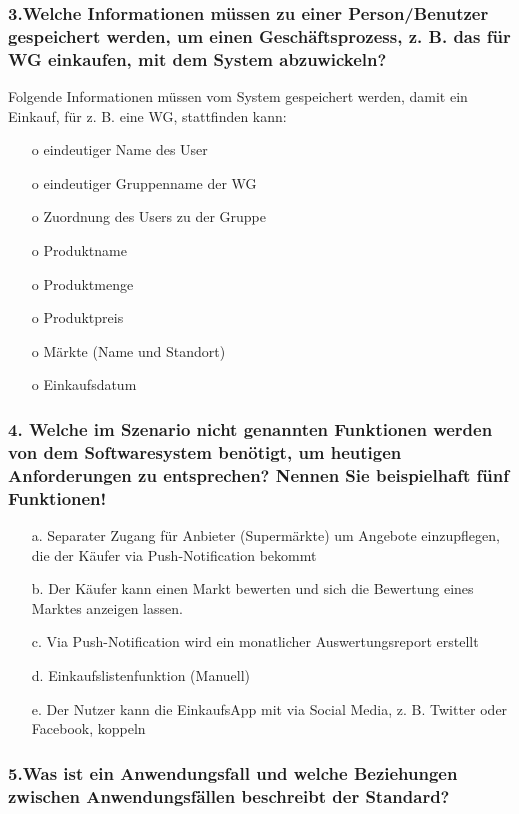 \documentclass[12pt,a4paper]{article}
\begin{document}
\subsubsection*{3.Welche Informationen müssen zu einer Person/Benutzer gespeichert werden, um einen Geschäftsprozess, z. B. das für WG einkaufen, mit dem System abzuwickeln?}

Folgende Informationen müssen vom System gespeichert werden, damit ein Einkauf, für z. B. eine WG, stattfinden kann:
\begin{itemize} 
\item[o] eindeutiger Name des User
\item[o] eindeutiger Gruppenname der WG
\item[o] Zuordnung des Users zu der Gruppe
\item[o] Produktname
\item[o] Produktmenge
\item[o] Produktpreis
\item[o] Märkte (Name und Standort)
\item[o] Einkaufsdatum
\end{itemize}
 
\subsubsection*{4. Welche im Szenario nicht genannten Funktionen werden von dem Softwaresystem benötigt, um heutigen Anforderungen zu entsprechen? Nennen Sie beispielhaft fünf Funktionen!}
\begin{itemize}
\item[a.] Separater Zugang für Anbieter (Supermärkte) um Angebote einzupflegen, die der Käufer via Push-Notification bekommt
\item[b.] Der Käufer kann einen Markt bewerten und sich die Bewertung eines Marktes anzeigen lassen.
\item[c.] Via Push-Notification wird ein monatlicher Auswertungsreport erstellt
\item[d.] Einkaufslistenfunktion (Manuell)
\item[e.] Der Nutzer kann die EinkaufsApp mit via Social Media, z. B. Twitter oder Facebook, koppeln
\end{itemize}
 
 
\subsubsection*{5.Was ist ein Anwendungsfall und welche Beziehungen zwischen Anwendungsfällen beschreibt der Standard?}
\end{document}
